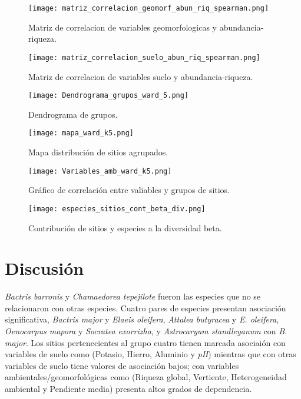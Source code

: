 \documentclass[11pt,]{article}
\begin{document}
\begin{figure}
\centering
\texttt{[image: matriz\_correlacion\_geomorf\_abun\_riq\_spearman.png]}
\caption{Matriz de correlacion de variables geomorfologicas y
abundancia-riqueza.
\label{fig:matriz_correlacion_geomorf_abun_riq_spearman}}
\end{figure}

\begin{figure}
\centering
\texttt{[image: matriz\_correlacion\_suelo\_abun\_riq\_spearman.png]}
\caption{Matriz de correlacion de variables suelo y abundancia-riqueza.
\label{fig:matriz_correlacion_suelo_abun_riq_spearman}}
\end{figure}

\begin{figure}
\centering
\texttt{[image: Dendrograma\_grupos\_ward\_5.png]}
\caption{Dendrograma de grupos. \label{fig:Dendrograma_grupos_ward_5}}
\end{figure}

\begin{figure}
\centering
\texttt{[image: mapa\_ward\_k5.png]}
\caption{Mapa distribución de sitios agrupados.
\label{fig:mapa_ward_k5}}
\end{figure}

\begin{figure}
\centering
\texttt{[image: Variables\_amb\_ward\_k5.png]}
\caption{Gráfico de correlación entre valiables y grupos de sitios.
\label{fig:Variables_amb_ward_k5}}
\end{figure}

\begin{figure}
\centering
\texttt{[image: especies\_sitios\_cont\_beta\_div.png]}
\caption{Contribución de sitios y especies a la diversidad beta.
\label{fig:especies_sitios_cont_beta_div}}
\end{figure}

\section{Discusión}\label{discusiuxf3n}

\emph{Bactris barronis} y \emph{Chamaedorea tepejilote} fueron las
especies que no se relacionaron con otras especies. Cuatro pares de
especies presentan asociación significativa, \emph{Bactris major} y
\emph{Elaeis oleifera}, \emph{Attalea butyracea} y \emph{E. oleifera},
\emph{Oenocarpus mapora} y \emph{Socratea exorrizha}, y
\emph{Astrocaryum standleyanum} con \emph{B. major}. Los sitios
pertenecientes al grupo cuatro tienen marcada asociaión con variables de
suelo como (Potasio, Hierro, Aluminio y \emph{pH}) mientras que con
otras variables de suelo tiene valores de asociación bajos; con
variables ambientales/geomorfológicas como (Riqueza global, Vertiente,
Heterogeneidad ambiental y Pendiente media) presenta altos grados de
dependencia.
\end{document}
